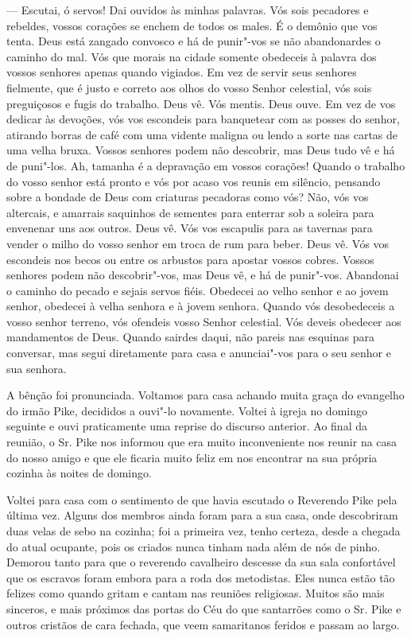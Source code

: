 --- Escutai, ó servos! Dai ouvidos às minhas palavras. Vós sois
pecadores e rebeldes, vossos corações se enchem de todos os males. É o
demônio que vos tenta. Deus está zangado convosco e há de punir"-vos se
não abandonardes o caminho do mal. Vós que morais na cidade somente
obedeceis à palavra dos vossos senhores apenas quando vigiados. Em vez
de servir seus senhores fielmente, que é justo e correto aos olhos do
vosso Senhor celestial, vós sois preguiçosos e fugis do trabalho. Deus
vê. Vós mentis. Deus ouve. Em vez de vos dedicar às devoções, vós vos
escondeis para banquetear com as posses do senhor, atirando borras de
café com uma vidente maligna ou lendo a sorte nas cartas de uma velha
bruxa. Vossos senhores podem não descobrir, mas Deus tudo vê e há de
puni"-los. Ah, tamanha é a depravação em vossos corações! Quando o
trabalho do vosso senhor está pronto e vós por acaso vos reunis em
silêncio, pensando sobre a bondade de Deus com criaturas pecadoras como
vós? Não, vós vos altercais, e amarrais saquinhos de sementes para
enterrar sob a soleira para envenenar uns aos outros. Deus vê. Vós vos
escapulis para as tavernas para vender o milho do vosso senhor em troca
de rum para beber. Deus vê. Vós vos escondeis nos becos ou entre os
arbustos para apostar vossos cobres. Vossos senhores podem não
descobrir"-vos, mas Deus vê, e há de punir"-vos. Abandonai o caminho do
pecado e sejais servos fiéis. Obedecei ao velho senhor e ao jovem
senhor, obedecei à velha senhora e à jovem senhora. Quando vós
desobedeceis a vosso senhor terreno, vós ofendeis vosso Senhor
celestial. Vós deveis obedecer aos mandamentos de Deus. Quando sairdes
daqui, não pareis nas esquinas para conversar, mas segui diretamente
para casa e anunciai"-vos para o seu senhor e sua senhora.

A bênção foi pronunciada. Voltamos para
casa achando muita graça do evangelho do irmão Pike, decididos a ouvi"-lo
novamente. Voltei à igreja no domingo seguinte e ouvi praticamente uma
reprise do discurso anterior. Ao final da reunião, o Sr. Pike nos
informou que era muito inconveniente nos reunir na casa do nosso amigo e
que ele ficaria muito feliz em nos encontrar na sua própria cozinha às
noites de domingo.

Voltei para casa com o sentimento de
que havia escutado o Reverendo Pike pela última vez. Alguns dos membros
ainda foram para a sua casa, onde descobriram duas velas de sebo na
cozinha; foi a primeira vez, tenho certeza, desde a chegada do atual
ocupante, pois os criados nunca tinham nada além de nós de pinho.
Demorou tanto para que o reverendo cavalheiro descesse da sua sala
confortável que os escravos foram embora para a roda dos metodistas.
Eles nunca estão tão felizes como quando gritam e cantam nas reuniões
religiosas. Muitos são mais sinceros, e mais próximos das portas do Céu
do que santarrões como o Sr. Pike e outros cristãos de cara fechada, que
veem samaritanos feridos e passam ao largo.

